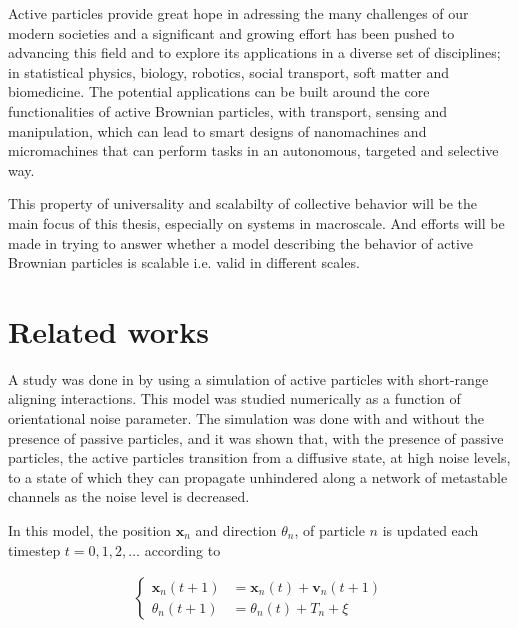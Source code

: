 Active particles provide great hope in adressing the many challenges of our modern societies and 
a significant and growing effort has been pushed to advancing this field and to explore its applications in a 
diverse set of disciplines\cite{bechinger2016active}; 
in statistical physics\cite{ramaswamy2010mechanics}, biology\cite{viswanathan2011physics}, 
robotics\cite{brambilla2013swarm}, social transport\cite{helbing2001traffic}, 
soft matter\cite{marchetti2013hydrodynamics} and biomedicine\cite{wang2012nano}. 
The potential applications can be built around the core functionalities of active 
Brownian particles, with transport, sensing and manipulation, which can lead 
to smart designs of nanomachines and micromachines that can perform tasks in an autonomous, 
targeted and selective way.


This property of universality and scalabilty of collective behavior will be the main focus 
of this thesis, especially on systems in macroscale. And efforts will be made in trying to answer 
whether a model describing the behavior of active Brownian particles is scalable i.e. valid 
in different scales.



\section{Related works}
A study was done in \citeyear{nilsson2017metastable} by \citeauthor{nilsson2017metastable} using a simulation of active particles with 
short-range aligning interactions\cite{nilsson2017metastable}. This model was studied numerically as a function of 
orientational noise parameter. The simulation was done with and without the presence of passive particles, 
and it was shown that, with the presence of passive particles, the active particles transition from a diffusive 
state, at high noise levels, to a state of which they can propagate unhindered along a network of metastable channels 
as the noise level is decreased. 

In this model, the position $\bm{x}_n$ and direction $\theta_n$, of particle $n$ 
is updated each timestep $t=0, 1, 2, \ldots$ according to 

\begin{align}
    \begin{cases}
        \bm{x}_n(t+1)       &= \bm{x}_n(t) + \bm{v}_n(t+1) \\
        \theta_n(t+1)       &=  \theta_n(t) + T_n + \xi
    \end{cases}
\end{align}

